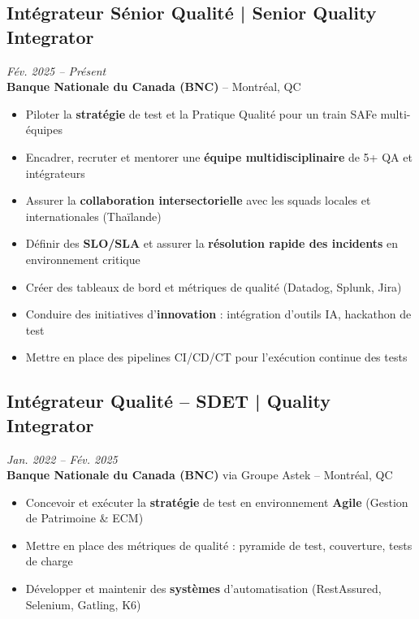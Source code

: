 \documentclass[11pt,a4paper]{article}
\newcommand{\highlight}[1]{\textbf{#1}}
\begin{document}
\subsection*{Int\'{e}grateur S\'{e}nior Qualit\'{e} | Senior Quality Integrator} \hfill \textit{F\'{e}v. 2025 -- Pr\'{e}sent}\\
\textbf{Banque Nationale du Canada (BNC)} -- Montr\'{e}al, QC
\begin{itemize}
    \item Piloter la \highlight{strat\'{e}gie} de test et la Pratique Qualit\'{e} pour un train SAFe multi-\'{e}quipes
    \item Encadrer, recruter et mentorer une \highlight{\'{e}quipe multidisciplinaire} de 5+ QA et int\'{e}grateurs
    \item Assurer la \highlight{collaboration intersectorielle} avec les squads locales et internationales (Tha\"{i}lande)
    \item D\'{e}finir des \highlight{SLO/SLA} et assurer la \highlight{r\'{e}solution rapide des incidents} en environnement critique
    \item Cr\'{e}er des tableaux de bord et m\'{e}triques de qualit\'{e} (Datadog, Splunk, Jira)
    \item Conduire des initiatives d'\highlight{innovation} : int\'{e}gration d'outils IA, hackathon de test
    \item Mettre en place des pipelines CI/CD/CT pour l'ex\'{e}cution continue des tests
\end{itemize}

\subsection*{Int\'{e}grateur Qualit\'{e} -- SDET | Quality Integrator} \hfill \textit{Jan. 2022 -- F\'{e}v. 2025}\\
\textbf{Banque Nationale du Canada (BNC)} via Groupe Astek -- Montr\'{e}al, QC
\begin{itemize}
    \item Concevoir et ex\'{e}cuter la \highlight{strat\'{e}gie} de test en environnement \highlight{Agile} (Gestion de Patrimoine \& ECM)
    \item Mettre en place des m\'{e}triques de qualit\'{e} : pyramide de test, couverture, tests de charge
    \item D\'{e}velopper et maintenir des \highlight{syst\`{e}mes} d'automatisation (RestAssured, Selenium, Gatling, K6)
\end{itemize}
\end{document}
